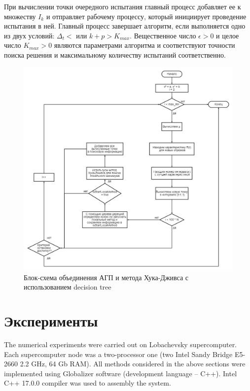 \documentclass{svproc}
\begin{document}
При вычислении точки очередного испытания главный процесс добавляет ее к множеству $I_k$ и отправляет рабочему процессу, который инициирует проведение испытания в ней.
Главный процесс завершает алгоритм, если выполняется одно из двух условий: $\Delta_t<$ или $k+p>K_{max}$.
Вещественное число $\epsilon>0$ и целое число $K_{max}>0$ являются параметрами алгоритма и соответствуют точности поиска решения и максимальному количеству испытаний соответственно.

\begin{figure}[ht!]

	\begin{center}
		\begin{minipage}[h]{0.9\linewidth}
			\includegraphics[width=1\linewidth]{figure/fig3.png}
			\caption{Блок-схема объединения АГП и метода Хука-Дживса с использованием decision tree} %
			\label{fig:fig3}
		\end{minipage}
	\end{center}
\end{figure}



\section{Эксперименты}

The numerical experiments were carried out on Lobachevsky supercomputer. Each supercomputer node was a two-processor one (two Intel Sandy Bridge E5-2660 2.2 GHz, 64 Gb RAM). All methods considered in the above sections were implemented using Globalizer software \cite{globalizerSystem} (development language – C++). Intel C++ 17.0.0 compiler was used to assembly the system.
\end{document}
